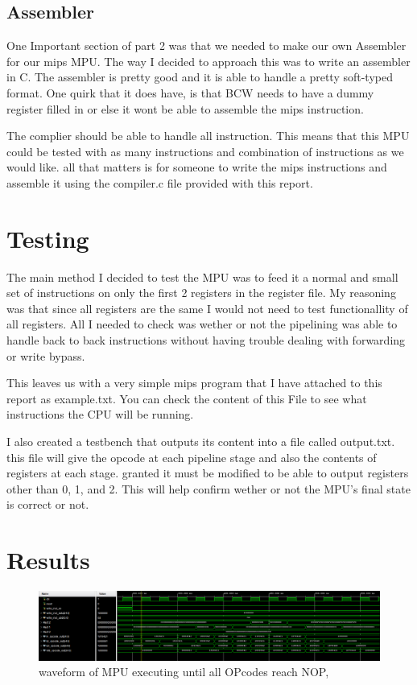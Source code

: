 \documentclass{article}
\begin{document}
\subsection{Assembler}

One Important section of part 2 was that we needed to make our own Assembler for our mips MPU. The way I decided to approach this was to write an assembler in C. The assembler is pretty good and it is able to handle a pretty soft-typed format. One quirk that it does have, is that BCW needs to have a dummy register filled in or else it wont be able to assemble the mips instruction.

The complier should be able to handle all instruction. This means that this MPU could be tested with as many instructions and combination of instructions as we would like. all that matters is for someone to write the mips instructions and assemble it using the compiler.c file provided with this report.

\section{Testing}

The main method I decided to test the MPU was to feed it a normal and small set of instructions on only the first 2 registers in the register file. My reasoning was that since all registers are the same I would not need to test functionallity of all registers. All I needed to check was wether or not the pipelining was able to handle back to back instructions without having trouble dealing with forwarding or write bypass.

This leaves us with a very simple mips program that I have attached to this report as example.txt. You can check the content of this File to see what instructions the CPU will be running. 

I also created a testbench that outputs its content into a file called output.txt. this file will give the opcode at each pipeline stage and also the contents of registers at each stage. granted it must be modified to be able to output registers other than 0, 1, and 2. This will help confirm wether or not the MPU's final state is correct or not.

\section{Results}

\begin{figure}
	\centering
	\includegraphics[width=1\linewidth]{imageOP.png}
	\caption{waveform of MPU executing until all OPcodes reach NOP,}
	\label{fig:waveform}
\end{figure}
\end{document}
